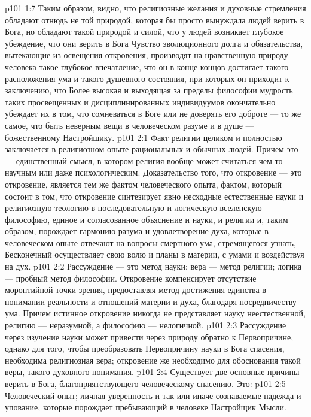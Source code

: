 \vs p101 1:7 Таким образом, видно, что религиозные желания и духовные стремления обладают отнюдь не той природой, которая бы просто вынуждала людей  верить в Бога, но обладают такой природой и силой, что у людей возникает глубокое убеждение, что они верить в Бога  Чувство эволюционного долга и обязательства, вытекающие из освещения откровения, производят на нравственную природу человека такое глубокое впечатление, что он в конце концов достигает такого расположения ума и такого душевного состояния, при которых он приходит к заключению, что  Более высокая и выходящая за пределы философии мудрость таких просвещенных и дисциплинированных индивидуумов окончательно убеждает их в том, что сомневаться в Боге или не доверять его доброте --- то же самое, что быть неверным  вещи в человеческом разуме и в душе --- божественному Настройщику.
\vs p101 2:1 Факт религии целиком и полностью заключается в религиозном опыте рациональных и обычных людей. Причем это --- единственный смысл, в котором религия вообще может считаться чем\hyp{}то научным или даже психологическим. Доказательство того, что откровение --- это откровение, является тем же фактом человеческого опыта, фактом, который состоит в том, что откровение синтезирует явно несходные естественные науки и религиозную теологию в последовательную и логическую вселенскую философию, единое и согласованное объяснение и науки, и религии и, таким образом, порождает гармонию разума и удовлетворение духа, которые в человеческом опыте отвечают на вопросы смертного ума, стремящегося узнать,  Бесконечный осуществляет свою волю и планы в материи, с умами и воздействуя на дух.
\vs p101 2:2 Рассуждение --- это метод науки; вера --- метод религии; логика --- пробный метод философии. Откровение компенсирует отсутствие моронтийной точки зрения, предоставляя метод достижения единства в понимании реальности и отношений материи и духа, благодаря посредничеству ума. Причем истинное откровение никогда не представляет науку неестественной, религию --- неразумной, а философию --- нелогичной.
\vs p101 2:3 Рассуждение через изучение науки может привести через природу обратно к Первопричине, однако для того, чтобы преобразовать Первопричину науки в Бога спасения, необходима религиозная вера; откровение же необходимо для обоснования такой веры, такого духовного понимания.
\vs p101 2:4 Существует две основные причины верить в Бога, благоприятствующего человеческому спасению. Это:
\vs p101 2:5 \bibnobreakspace Человеческий опыт; личная уверенность и так или иначе сознаваемые надежда и упование, которые порождает пребывающий в человеке Настройщик Мысли.
